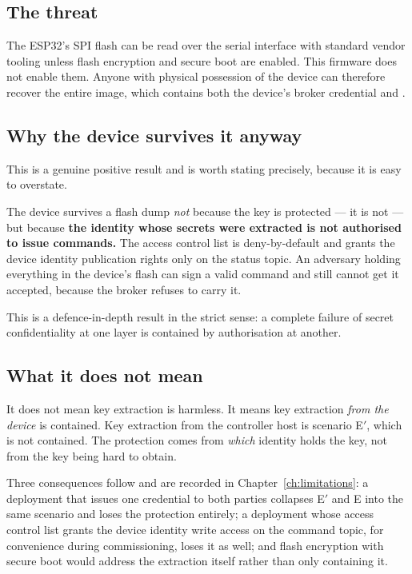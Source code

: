 \subsection{The threat}

The ESP32's SPI flash can be read over the serial interface with standard vendor tooling unless
flash encryption and secure boot are enabled. This firmware does not enable them. Anyone with
physical possession of the device can therefore recover the entire image, which contains both the
device's broker credential and .

\subsection{Why the device survives it anyway}

This is a genuine positive result and is worth stating precisely, because it is easy to
overstate.

The device survives a flash dump \emph{not} because the key is protected --- it is not --- but
because \textbf{the identity whose secrets were extracted is not authorised to issue commands.}
The access control list is deny-by-default and grants the device identity publication rights only
on the status topic. An adversary holding everything in the device's flash can sign a
valid  command and still cannot get it accepted, because the broker refuses to
carry it.

This is a defence-in-depth result in the strict sense: a complete failure of secret
confidentiality at one layer is contained by authorisation at another.

\subsection{What it does not mean}

It does not mean key extraction is harmless. It means key extraction \emph{from the device} is
contained. Key extraction from the controller host is scenario E$'$, which is not contained. The
protection comes from \emph{which} identity holds the key, not from the key being hard to obtain.

Three consequences follow and are recorded in Chapter~\ref{ch:limitations}: a deployment that
issues one credential to both parties collapses E$'$ and E into the same scenario and loses the
protection entirely; a deployment whose access control list grants the device identity write
access on the command topic, for convenience during commissioning, loses it as well; and flash
encryption with secure boot would address the extraction itself rather than only containing it.

